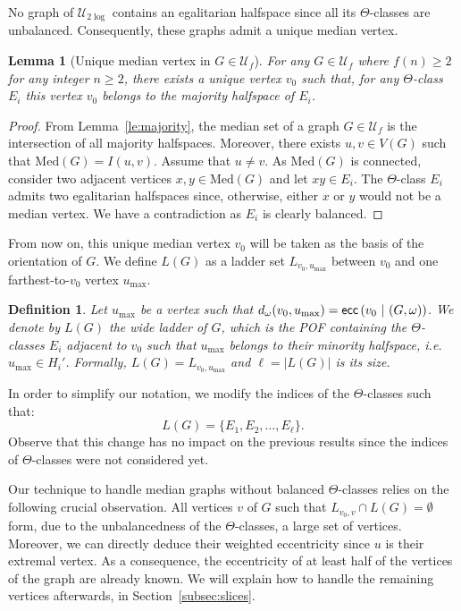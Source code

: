 \documentclass[11pt,letterpaper]{article}
\newtheorem{lemma}{Lemma}
\newtheorem{definition}{Definition}
\newcommand{\wecc}[2]{\mbox{\textsf{ecc}}\left(#1 ~\vert ~ #2\right)}
\newcommand{\ulog}{\mathcal{U}_{2\log}}
\newcommand{\med}{\mbox{Med}}
\newcommand{\umax}{u_{\max}}
\begin{document}
No graph of $\ulog$ contains an egalitarian halfspace since all its $\Theta$-classes are unbalanced. Consequently, these graphs admit a unique median vertex.

\begin{lemma}[Unique median vertex in $G\in \mathcal{U}_f$]
For any $G\in \mathcal{U}_f$ where $f(n) \ge 2$ for any integer $n \ge 2$, there exists a unique vertex $v_0$ such that, for any $\Theta$-class $E_i$ this vertex $v_0$ belongs to the majority halfspace of $E_i$.
\end{lemma}

\begin{proof}
From Lemma~\ref{le:majority}, the median set of a graph $G \in \mathcal{U}_f$ is the intersection of all majority halfspaces. Moreover, there exists $u,v \in V(G)$ such that $\med(G) = I(u,v)$. Assume that $u\neq v$. As $\med(G)$ is connected, consider two adjacent vertices $x,y \in \med(G)$ and let $xy \in E_i$. The $\Theta$-class $E_i$ admits two egalitarian halfspaces since, otherwise, either $x$ or $y$ would not be a median vertex. We have a contradiction as $E_i$ is clearly balanced.
\end{proof}

From now on, this unique median vertex $v_0$  will be taken as the basis of the orientation of $G$. We define $L(G)$ as a ladder set $L_{v_0,\umax}$ between $v_0$ and one farthest-to-$v_0$ vertex $\umax$.

\begin{definition}
Let $\umax$ be a vertex such that $d_{\omega}(v_0,\umax) = \wecc{v_0}{(G,\omega)}$. We denote by $L(G)$ the \textit{wide ladder} of $G$, which is the POF containing the $\Theta$-classes $E_i$ adjacent to $v_0$ such that $\umax$ belongs to their minority halfspace, {\em i.e.} $\umax \in H_i'$. Formally, $L(G) = L_{v_0,\umax}$ and $\ell = \vert L(G) \vert$ is its size.
\label{def:wide_ladder}
\end{definition}

In order to simplify our notation, we modify the indices of the $\Theta$-classes such that: $$L(G) = \{E_1,E_2,\ldots,E_{\ell}\}.$$ Observe that this change has no impact on the previous results since the indices of $\Theta$-classes were not considered yet.

Our technique to handle median graphs without balanced $\Theta$-classes relies on the following crucial observation. All vertices $v$ of $G$ such that $L_{v_0,v} \cap L(G) = \emptyset$ form, due to the unbalancedness of the $\Theta$-classes, a large set of vertices. Moreover, we can directly deduce their weighted eccentricity since $u$ is their extremal vertex. As a consequence, the eccentricity of at least half of the vertices of the graph are already known. We will explain how to handle the remaining vertices afterwards, in Section~\ref{subsec:slices}.
\end{document}
